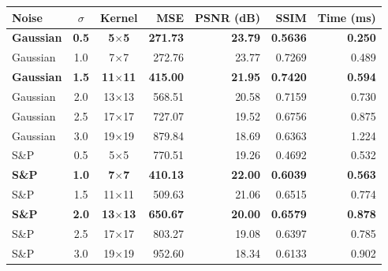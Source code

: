 \begin{tabular}{lccrrrr}
\toprule
Noise & $\sigma$ & Kernel & MSE & PSNR (dB) & SSIM & Time (ms) \\
\midrule
\textbf{Gaussian} & \textbf{0.5} & \textbf{5$\times$5} & \textbf{271.73} & \textbf{23.79} & \textbf{0.5636} & \textbf{0.250} \\
Gaussian & 1.0 & 7$\times$7 & 272.76 & 23.77 & 0.7269 & 0.489 \\
\textbf{Gaussian} & \textbf{1.5} & \textbf{11$\times$11} & \textbf{415.00} & \textbf{21.95} & \textbf{0.7420} & \textbf{0.594} \\
Gaussian & 2.0 & 13$\times$13 & 568.51 & 20.58 & 0.7159 & 0.730 \\
Gaussian & 2.5 & 17$\times$17 & 727.07 & 19.52 & 0.6756 & 0.875 \\
Gaussian & 3.0 & 19$\times$19 & 879.84 & 18.69 & 0.6363 & 1.224 \\
\midrule
S\&P & 0.5 & 5$\times$5 & 770.51 & 19.26 & 0.4692 & 0.532 \\
\textbf{S\&P} & \textbf{1.0} & \textbf{7$\times$7} & \textbf{410.13} & \textbf{22.00} & \textbf{0.6039} & \textbf{0.563} \\
S\&P & 1.5 & 11$\times$11 & 509.63 & 21.06 & 0.6515 & 0.774 \\
\textbf{S\&P} & \textbf{2.0} & \textbf{13$\times$13} & \textbf{650.67} & \textbf{20.00} & \textbf{0.6579} & \textbf{0.878} \\
S\&P & 2.5 & 17$\times$17 & 803.27 & 19.08 & 0.6397 & 0.785 \\
S\&P & 3.0 & 19$\times$19 & 952.60 & 18.34 & 0.6133 & 0.902 \\
\bottomrule
\end{tabular}
